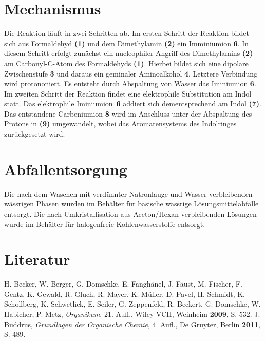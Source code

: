\documentclass[12pt]{article}
\begin{document}
\begin{onehalfspace}
\section{Mechanismus\cite{bio}}
Die Reaktion läuft in zwei Schritten ab. Im ersten Schritt der Reaktion bildet sich aus Formaldehyd \textbf{(1)} und dem Dimethylamin \textbf{(2)} ein Imminiumion \textbf{6}. In diesem Schritt erfolgt zunächst ein nucleophiler Angriff des Dimethylamins \textbf{(2)} am Carbonyl-C-Atom des Formaldehyds \textbf{(1)}. Hierbei bildet sich eine dipolare Zwischenstufe \textbf{3} und daraus ein geminaler Aminoalkohol \textbf{4}. Letztere Verbindung wird protononiert. Es entsteht durch Abspaltung von Wasser das Iminiumion \textbf{6}. Im zweiten Schritt der Reaktion findet eine elektrophile Substitution am Indol statt. Das elektrophile \mbox{Iminiumion \textbf{6}} addiert sich dementsprechend am Indol \textbf{(7)}.
Das entstandene Carbeniumion \textbf{8} wird im Anschluss unter der Abspaltung des Protons in \mbox{} \textbf{(9)} umgewandelt, wobei das Aromatensystems des Indolringes zurückgesetzt wird.
\section{Abfallentsorgung}
Die nach dem Waschen mit verdünnter Natronlauge und Wasser verbleibenden wässrigen Phasen wurden im Behälter für basische wässrige Lösungsmittelabfälle entsorgt. Die nach Umkristallisation aus Aceton/Hexan verbleibenden Lösungen wurde im Behälter für halogenfreie Kohlenwasserstoffe entsorgt.
\section{Literatur}
\renewcommand{\section}[2]{}%
\begin{thebibliography}{}
H. Becker, W. Berger, G. Domschke, E. Fanghänel, J. Faust, M. Fischer, F. Gentz, K. Gewald, R. Gluch, R. Mayer, K. Müller, D. Pavel, H. Schmidt, K. Schollberg, K. Schwetlick, E. Seiler, G. Zeppenfeld, R. Beckert, G. Domschke, W. Habicher, P. Metz, \textit{Organikum}, 21. Aufl., Wiley-VCH, Weinheim \textbf{2009}, S. 532.
J. Buddrus, \textit{Grundlagen der Organische Chemie}, 4. Aufl., De Gruyter, Berlin \textbf{2011}, S. 489.
\end{thebibliography}
\end{onehalfspace}
\end{document}
